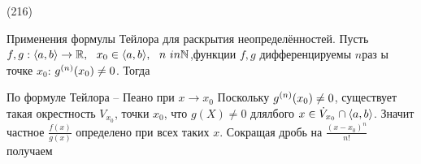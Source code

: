 (216)

\T \q Применения формулы Тейлора для раскрытия неопределённостей. Пусть $f, g :\ang ab \to\R,\s x_0 \in \ang ab,\s n\ in\N$,функции $f, g$ дифференцируемы $n$раз ы точке $x_0$:   $g^{(n)}(x_0) \neq 0$. Тогда 

\D По формуле Тейлора -- Пеано при $x\to x_0$   Поскольку $g^{(n)}(x_0) \neq 0$, существует такая окрестность $V_{x_0}$, точки $x_0$, что $g(X) \neq 0$ длялбого $x \in \dot{V}_{x_0} \cap \langle a, b \rangle$. Значит частное $\frac{f(x)}{g(x)}$ определено при всех таких $x$. Сокращая дробь на $\frac{(x - x_0)^n}{n!}$ получаем 